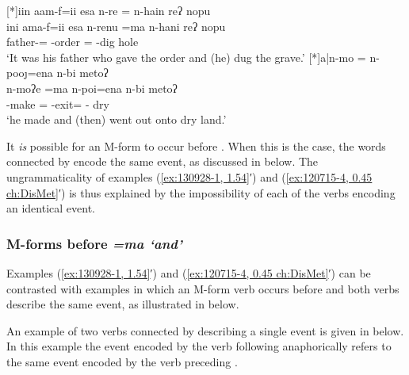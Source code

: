 \begin{exe}
	{\glll	iin aam-f=ii esa n-re = n-hain reʔ nopu\\
						ini ama-f=ii esa n-renu =ma n-hani reʔ nopu\\
						{\iin} father-{\F}={\ii} {\esc} \n-order{\tbrM} = \n-dig{\M} {\reqt} hole\\
			\glt	`It was his father who gave the order and (he) dug the grave.' }
	{\glll	a|n-mo = n-poo\j=ena n-bi metoʔ\\
						{\a}n-moʔe =ma n-poi=ena n-bi metoʔ\\
						{\a\n}-make{\tbrM} = \n-exit{\Mv}={\een} \n-{\bi} dry\\
			\glt	{}`he made and (then) went out onto dry land.' \txrf{el. 13/02/16 p.16}}
\end{exe}

It \emph{is} possible for an M-form to occur before .
When this is the case, the words connected by 
encode the same event, as discussed in  below.
The ungrammaticality of examples (\ref{ex:130928-1, 1.54}′)
and (\ref{ex:120715-4, 0.45 ch:DisMet}′) is thus explained by the impossibility
of each of the verbs encoding an identical event.

\subsubsection{M-forms before \it{=ma} `and'}\label{sec:Mfo=Ma}
Examples (\ref{ex:130928-1, 1.54}′) and (\ref{ex:120715-4, 0.45 ch:DisMet}′)
can be contrasted with examples in which an M-form verb occurs before 
and both verbs describe the same event, as illustrated in  below.

	\begin{exe}\let\eachwordone=\textnormal
		\label{ex:=ma2}
	\end{exe}

An example of two verbs connected by  describing a single event
is given in  below.
In this example the event encoded by the verb following 
anaphorically refers to the same event encoded by the verb preceding .

